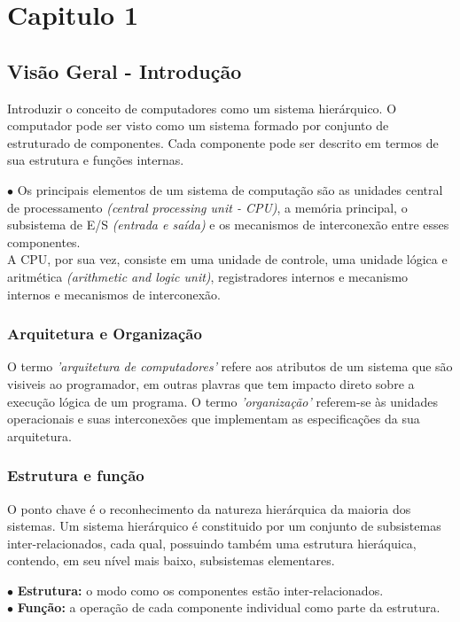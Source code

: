\chapter{Capitulo 1}
\section[introdução]{Visão Geral - Introdução}
  Introduzir o conceito de computadores como um sistema hierárquico. O computador pode ser visto como um sistema formado por conjunto de estruturado de componentes. Cada componente pode ser descrito em termos de sua estrutura e funções internas.

  $ \bullet $ Os principais elementos de um sistema de computação são as unidades central de processamento \textit{(central processing unit - CPU)}, a memória principal, o subsistema de E/S \textit{(entrada e saída)} e os mecanismos de interconexão entre esses componentes. \\
  A CPU, por sua vez, consiste em uma unidade de controle, uma unidade lógica e aritmética \textit{(arithmetic and logic unit)}, registradores internos e mecanismo internos e mecanismos de interconexão.



\subsection{Arquitetura e Organização}
  O termo \textit{'arquitetura de computadores'} refere aos atributos de um sistema que são visiveis ao programador, em outras plavras que tem impacto direto sobre a execução lógica de um programa. O termo \textit{'organização'} referem-se às unidades operacionais e suas interconexões que implementam as especificações da sua arquitetura.


 \subsection{Estrutura e função}
    O ponto chave é o reconhecimento da natureza hierárquica da maioria dos sistemas. Um sistema hierárquico é constituido por um conjunto de subsistemas inter-relacionados, cada qual, possuindo também uma estrutura hieráquica, contendo, em seu nível mais baixo, subsistemas elementares.

    $ \bullet $ \textbf{Estrutura:} o modo como os componentes estão inter-relacionados. \\
    $ \bullet $ \textbf{Função:} a operação de cada componente individual como parte da estrutura. \\

